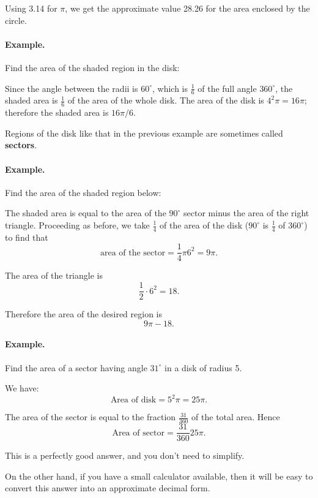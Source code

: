 \documentclass[12pt]{book} %
\begin{document}
Using 3.14 for $\pi$, we get the approximate value 28.26 for the area enclosed by the circle.

\paragraph{Example.}
Find the area of the shaded region in the disk:


Since the angle between the radii is $60^\circ$, which is $\frac16$ of the full angle $360^\circ$, the shaded area is $\frac16$ of the area of the whole disk. The area of the disk is $4^2\pi=16\pi$; therefore the shaded area is $16\pi/6$.

Regions of the disk like that in the previous example are sometimes called \textbf{sectors}.

\paragraph{Example.}
Find the area of the shaded region below:


The shaded area is equal to the area of the $90^\circ$ sector minus the area of the right triangle. Proceeding as before, we take $\frac14$ of the area of the disk ($90^\circ$ is $\frac14$ of $360^\circ$) to find that
\[
\text{area of the sector}=\frac14\pi 6^2=9\pi.
\]

The area of the triangle is
\[
\frac12\cdot 6^2=18.
\]

Therefore the area of the desired region is
\[
9\pi-18.
\]

\paragraph{Example.}
Find the area of a sector having angle $31^\circ$ in a disk of radius 5.


We have:
\[
\text{Area of disk}=5^2\pi=25\pi.
\]

The area of the sector is equal to the fraction $\frac{31}{360}$ of the total area. Hence
\[
\text{Area of sector}=\frac{31}{360}25\pi.
\]

This is a perfectly good answer, and you don't need to simplify.

On the other hand, if you have a small calculator available, then it will be easy to convert this answer into an approximate decimal form.
\end{document}
